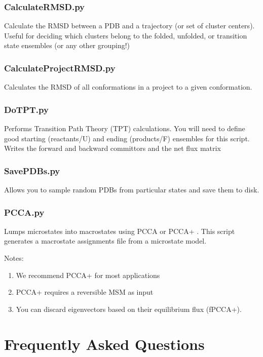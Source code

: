 \documentclass[12pt]{article}
\begin{document}
\subsubsection{CalculateRMSD.py}
Calculate the RMSD between a PDB and a trajectory (or set of cluster centers). Useful for deciding which clusters belong to the folded, unfolded, or transition state ensembles (or any other grouping!)

\subsubsection{CalculateProjectRMSD.py}
Calculates the RMSD of all conformations in a project to a given conformation.

\subsubsection{DoTPT.py}
Performs Transition Path Theory (TPT) calculations. You will need to define good starting (reactants/U) and ending (products/F) ensembles for this script. Writes the forward and backward committors and the net flux matrix

\subsubsection{SavePDBs.py}
Allows you to sample random PDBs from particular states and save them to disk.

\subsubsection{PCCA.py}
Lumps microstates into macrostates using PCCA \cite{Deuflhard2000} or PCCA+ \cite{Deuflhard2005, kube2007coarse}. This script generates a macrostate assignments file from a microstate model.  

Notes:
\begin{enumerate}
 \item We recommend PCCA+ for most applications
 \item PCCA+ requires a reversible MSM as input
 \item You can discard eigenvectors based on their equilibrium flux (fPCCA+).
\end{enumerate}

\newpage

\section{Frequently Asked Questions}
\end{document}

